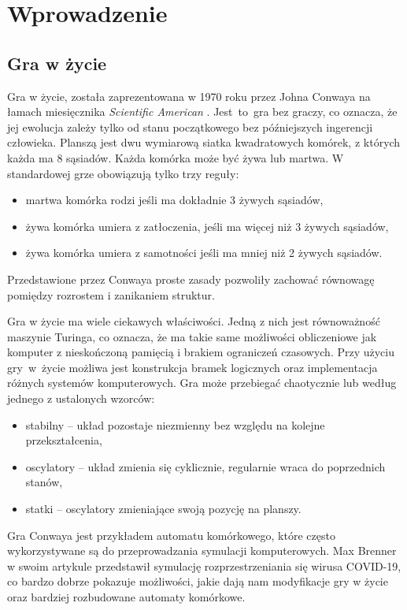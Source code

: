 \documentclass[declaration,shortabstract, inz]{iithesis}
\author         {Marcin Rogala}
\date          {today}
\theoremstyle{definition} \newtheorem{definition}{Definicja}[]
\theoremstyle{plain} \newtheorem{remark}[definition]{Obserwacja}
\theoremstyle{plain} \newtheorem{theorem}[definition]{Twierdzenie}
\theoremstyle{plain} \newtheorem{example}{Przykład}[definition]
\theoremstyle{plain} \newtheorem{lemma}[definition]{Lemat}
\begin{document}
\chapter{Wprowadzenie}
\section{Gra w życie}
Gra w życie, została zaprezentowana w 1970 roku przez Johna Conwaya na łamach miesięcznika \textit{Scientific American} \cite{gardner}.  Jest~to~gra bez graczy, co oznacza, że jej ewolucja zależy tylko od stanu początkowego bez późniejszych ingerencji człowieka. Planszą jest dwu wymiarową siatka kwadratowych komórek, z których każda ma 8 sąsiadów. Każda komórka może być żywa lub martwa. W standardowej grze obowiązują tylko trzy reguły:

\begin{itemize}
\item martwa komórka rodzi jeśli ma dokładnie 3 żywych sąsiadów,
\item żywa komórka umiera z zatłoczenia, jeśli ma więcej niż 3 żywych sąsiadów,
\item żywa komórka umiera z samotności jeśli ma mniej niż 2 żywych sąsiadów.
\end{itemize}

Przedstawione przez Conwaya proste zasady pozwoliły zachować równowagę pomiędzy rozrostem i zanikaniem struktur.

Gra w życie ma wiele ciekawych właściwości. Jedną z nich jest równoważność maszynie Turinga, co oznacza, że ma takie same możliwości obliczeniowe jak komputer z nieskończoną pamięcią i brakiem ograniczeń czasowych. Przy użyciu gry~w~życie możliwa jest konstrukcja bramek logicznych oraz implementacja różnych systemów komputerowych. Gra może przebiegać chaotycznie lub według jednego z ustalonych wzorców: 
\begin{itemize}
	\item stabilny -- układ pozostaje niezmienny bez względu na kolejne przekształcenia,
	\item oscylatory -- układ zmienia się cyklicznie, regularnie wraca do poprzednich stanów,
	\item statki -- oscylatory zmieniające swoją pozycję na planszy.
\end{itemize}

Gra Conwaya jest przykładem automatu komórkowego, które często wykorzystywane są do przeprowadzania symulacji komputerowych. 
Max Brenner w swoim artykule \cite{brenner} przedstawił symulację rozprzestrzeniania się wirusa COVID-19, co bardzo dobrze pokazuje możliwości, jakie dają nam modyfikacje gry w życie oraz bardziej rozbudowane automaty komórkowe.
\end{document}
